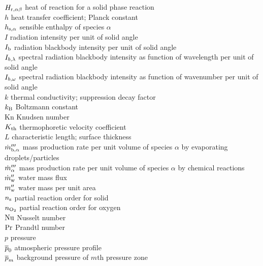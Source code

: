 \begin{tabbing}
$H_{{\rm r},\alpha\beta}$ \> heat of reaction for a solid phase reaction     \\
$h$                       \> heat transfer coefficient; Planck constant      \\
$h_{\rm s,\alpha}$        \> sensible enthalpy of species $\alpha$   \\
$I$                       \> radiation intensity per unit of solid angle     \\
$I_{\rm b}$               \> radiation blackbody intensity per unit of solid angle  \\
$I_{b,\rm \lambda}$           \> spectral radiation blackbody intensity as function of wavelength per unit of solid angle  \\
$I_{b,\rm \omega}$           \> spectral radiation blackbody intensity as function of wavenumber per unit of solid angle  \\
$k$                       \> thermal conductivity; suppression decay factor \\
$k_{\rm B}$               \> Boltzmann constant                             \\
Kn                        \> Knudsen number \\
$K_{\rm th}$              \> thermophoretic velocity coefficient \\
$L$                       \> characteristic length; surface thickness \\
$\dot{m}_{{\rm b},\alpha}'''$ \> mass production rate per unit volume of species $\alpha$ by evaporating droplets/particles \\
$\dot{m}_\alpha'''$           \> mass production rate per unit volume of species $\alpha$ by chemical reactions \\
$\dot{m}_{\rm w}''$           \> water mass flux  \\
$m_{\rm w}''$             \> water mass per unit area \\
$n_{\rm s}$               \> partial reaction order for solid \\
$n_{\rm O_2}$             \> partial reaction order for oxygen \\
$\hbox{Nu}$                     \> Nusselt number \\
$\hbox{Pr}$                     \> Prandtl number \\
$p$                       \> pressure \\
$\overline{p}_0$                   \> atmospheric pressure profile \\
$\overline{p}_m$                   \> background pressure of $m$th pressure zone \\

\end{tabbing}
